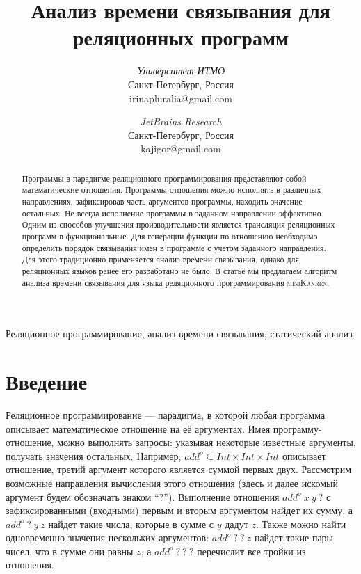 \documentclass[conference,a4paper,american,russian]{IEEEtran}
\newcommand{\miniKanren}{\textsc{miniKanren}}
\begin{document}
\title{Анализ времени связывания для реляционных программ}

\author{
\textit{Университет ИТМО} \\
Санкт-Петербург, Россия \\
irinapluralia@gmail.com
\and
{}
\textit{JetBrains Research}\\
Санкт-Петербург, Россия \\
kajigor@gmail.com
}


\maketitle

\begin{abstract}
Программы в парадигме реляционного программирования представляют собой математические отношения.
Программы-отношения можно исполнять в различных направлениях: зафиксировав часть аргументов программы, находить значение остальных.
Не всегда исполнение программы в заданном направлении эффективно. 
Одним из способов улучшения производительности является трансляция реляционных программ в функциональные. 
Для генерации функции по отношению необходимо определить порядок связывания имен в программе с учётом заданного направления.
Для этого традиционно применяется анализ времени связывания, однако для реляционных языков ранее его разработано не было.
В статье мы предлагаем алгоритм анализа времени связывания для языка реляционного программирования \miniKanren{}. 
\end{abstract}

\begin{IEEEkeywords}
Реляционное программирование, анализ времени связывания, статический анализ
\end{IEEEkeywords}

\section{Введение}

Реляционное программирование --- парадигма, в которой любая программа описывает математическое отношение на её аргументах. 
Имея программу-отношение, можно выполнять запросы: указывая некоторые известные аргументы, получать значения остальных.
Например, $add^o \subseteq Int \times Int \times Int$ описывает отношение, третий аргумент которого является суммой первых двух. 
Рассмотрим возможные направления вычисления этого отношения (здесь и далее искомый аргумент будем обозначать знаком ``$?$'').
Выполнение отношения $add^o  \ x \ y \ ?$ с зафиксированными (входными) первым и вторым аргументом найдет их сумму, а $add^o \ ? \ y \ z$ найдет такие числа, которые в сумме с $y$ дадут $z$. 
Также можно найти одновременно значения нескольких аргументов: $add^o \ ? \ ? \ z$ найдет такие пары чисел, что в сумме они равны $z$, а $add^o \ ? \ ? \ ?$ перечислит все тройки из отношения. 
\end{document}

